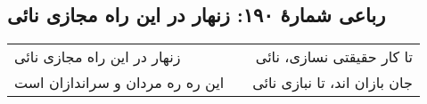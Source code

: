 \begin{center}
\section*{رباعی شمارهٔ ۱۹۰: زنهار در این راه مجازی نائی}
\label{sec:190}
\begin{longtable}{l p{0.5cm} r}
زنهار در این راه مجازی نائی
&&
تا کار حقیقتی نسازی، نائی
\\
این ره ره مردان و سراندازان است
&&
جان بازان اند، تا نبازی نائی
\\
\end{longtable}
\end{center}
